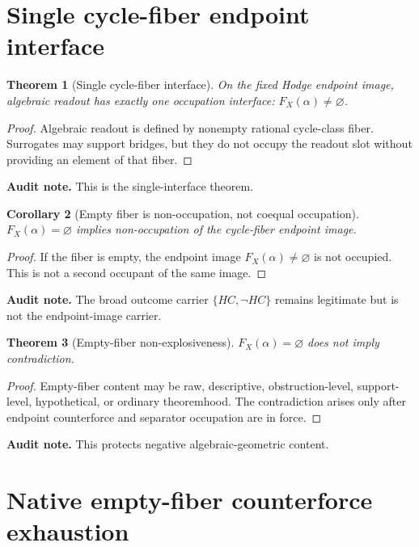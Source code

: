 \documentclass[11pt]{article}
\newtheorem{theorem}{Theorem}[section]
\newtheorem{corollary}[theorem]{Corollary}
\begin{document}
\section{Single cycle-fiber endpoint interface}


\begin{theorem}[Single cycle-fiber interface]
On the fixed Hodge endpoint image, algebraic readout has exactly one occupation interface: $F_X(\alpha)\neq\varnothing$.
\end{theorem}
\begin{proof}
Algebraic readout is defined by nonempty rational cycle-class fiber. Surrogates may support bridges, but they do not occupy the readout slot without providing an element of that fiber.
\end{proof}
\par\noindent\textbf{Audit note.} This is the single-interface theorem.


\begin{corollary}[Empty fiber is non-occupation, not coequal occupation]
$F_X(\alpha)=\varnothing$ implies non-occupation of the cycle-fiber endpoint image.
\end{corollary}
\begin{proof}
If the fiber is empty, the endpoint image $F_X(\alpha)\neq\varnothing$ is not occupied. This is not a second occupant of the same image.
\end{proof}
\par\noindent\textbf{Audit note.} The broad outcome carrier $\{HC,\neg HC\}$ remains legitimate but is not the endpoint-image carrier.


\begin{theorem}[Empty-fiber non-explosiveness]
$F_X(\alpha)=\varnothing$ does not imply contradiction.
\end{theorem}
\begin{proof}
Empty-fiber content may be raw, descriptive, obstruction-level, support-level, hypothetical, or ordinary theoremhood. The contradiction arises only after endpoint counterforce and separator occupation are in force.
\end{proof}
\par\noindent\textbf{Audit note.} This protects negative algebraic-geometric content.


\section{Native empty-fiber counterforce exhaustion}
\end{document}
